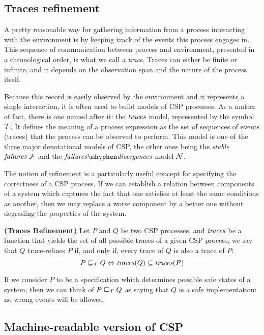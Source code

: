 \subsection{Traces refinement}

A pretty reasonable way for gathering information from a process interacting with the environment is by keeping track of the events this process engages in. This sequence of communication between process and environment, presented in a chronological order, is what we call a \emph{trace}. Traces can either be finite or infinite, and it depends on the observation span and the nature of the process itself.

Because this record is easily observed by the environment and it represents a single interaction, it is often used to build models of CSP processes. As a matter of fact, there is one named after it: the $ \mathit{\traces} $ model, represented by the symbol $ \tmodel $. It defines the meaning of a process expression as the set of sequences of events (traces) that the process can be observed to perform. This model is one of the three major denotational models of CSP, the other ones being the \emph{stable} $ \mathit{\failures} \ \fmodel $ and the $ \mathit{\failures \mhyphen \divergences} $ model $ \nmodel $.

The notion of refinement is a particularly useful concept for specifying the correctness of a CSP process. If we can establish a relation between components of a system which captures the fact that one satisfies at least the same conditions as another, then we may replace a worse component by a better one without degrading the properties of the system.

\begin{definition}{\textbf{(Traces Refinement)}}
	Let $ P $ and $ Q $ be two CSP processes, and $ \mathit{\traces} $ be a function that yields the set of all possible traces of a given CSP process, we say that $ Q $ trace-refines $ P $ if, and only if, every trace of $ Q $ is also a trace of $ P $:
	\[  P \refinedby[\tmodel] Q \iff \mathit{\traces}(Q) \subseteq \mathit{\traces}(P) \]
\end{definition}

If we consider $ P $ to be a specification which determines possible safe states of a system, then we can think of $ P \refinedby[\tmodel] Q $ as saying that $ Q $ is a safe implementation: no wrong events will be allowed. 

\subsection{Machine-readable version of CSP}

